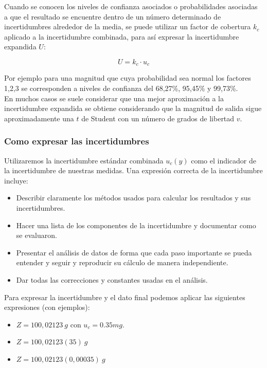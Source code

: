 \documentclass[12pt,a4paper]{book}
\begin{document}
Cuando se conocen los niveles de confianza asociados o probabilidades asociadas a que el resultado se encuentre dentro de un número determinado de incertidumbres alrededor de la media, se puede utilizar un factor de cobertura $k_c$ aplicado a la incertidumbre combinada, para así expresar la incertidumbre expandida $U$:

\begin{equation}
U = k_c \cdot u_c
\end{equation}

Por ejemplo para una magnitud que cuya probabilidad sea normal los factores 1,2,3 se corresponden a niveles de confianza del 68,27\%, 95,45\% y 99,73\%.  \\

En muchos casos se suele considerar que una mejor aproximación a la incertidumbre expandida se obtiene considerando que la magnitud de salida sigue aproximadamente una $t$ de Student con un número de grados de libertad $v$. 

\subsubsection{Como expresar las incertidumbres}

Utilizaremos la incertidumbre estándar combinada $u_c(y)$ como el indicador de la incertidumbre de nuestras medidas. Una expresión correcta de la incertidumbre incluye:

\begin{itemize}
\item Describir claramente los métodos usados para calcular los resultados y sus incertidumbres.
\item Hacer una lista de los componentes de la incertidumbre y documentar como se evaluaron.
\item Presentar el análisis de datos de forma que cada paso importante se pueda entender y seguir y reproducir su cálculo de manera independiente. 
\item Dar todas las correcciones y constantes usadas en el análisis.
\end{itemize}

Para expresar la incertidumbre y el dato final podemos aplicar las siguientes expresiones (con ejemplos):

\begin{itemize}
\item $Z = 100,02123 \ g $ con $u_c = 0.35 mg$.
\item $Z = 100,02123(35) \ g $
\item $Z = 100,02123(0,00035) \ g$

\end{itemize}
\end{document}
